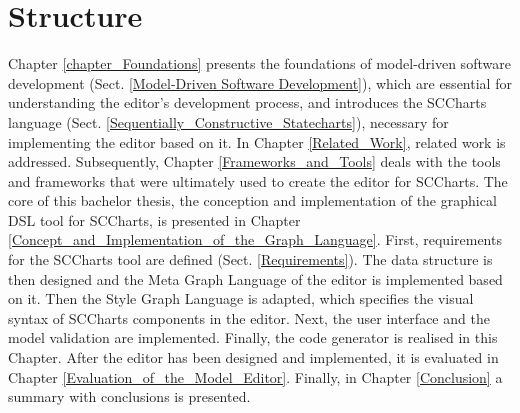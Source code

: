 \section{Structure}
Chapter \ref{chapter_Foundations} presents the foundations of model-driven software development (Sect. \ref{Model-Driven Software Development}), which are essential for understanding the editor's development process, and introduces the SCCharts language (Sect. \ref{Sequentially_Constructive_Statecharts}), necessary for implementing the editor based on it. In Chapter \ref{Related_Work}, related work is addressed. Subsequently, Chapter \ref{Frameworks_and_Tools} deals with the tools and frameworks that were ultimately used to create the editor for SCCharts. The core of this bachelor thesis, the conception and implementation of the graphical DSL tool for SCCharts, is presented in Chapter \ref{Concept_and_Implementation_of_the_Graph_Language}. First, requirements for the SCCharts tool are defined (Sect. \ref{Requirements}). The data structure is then designed and the Meta Graph Language of the editor is implemented based on it. Then the Style Graph Language is adapted, which specifies the visual syntax of SCCharts components in the editor. Next, the user interface and the model validation are implemented. Finally, the code generator is realised in this Chapter. After the editor has been designed and implemented, it is evaluated in Chapter \ref{Evaluation_of_the_Model_Editor}. Finally, in Chapter \ref{Conclusion} a summary with conclusions is presented.

